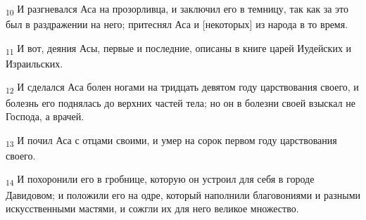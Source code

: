 \begin{tcolorbox}
\textsubscript{10} И разгневался Аса на прозорливца, и заключил его в темницу, так как за это был в раздражении на него; притеснял Аса и [некоторых] из народа в то время.
\end{tcolorbox}
\begin{tcolorbox}
\textsubscript{11} И вот, деяния Асы, первые и последние, описаны в книге царей Иудейских и Израильских.
\end{tcolorbox}
\begin{tcolorbox}
\textsubscript{12} И сделался Аса болен ногами на тридцать девятом году царствования своего, и болезнь его поднялась до верхних частей тела; но он в болезни своей взыскал не Господа, а врачей.
\end{tcolorbox}
\begin{tcolorbox}
\textsubscript{13} И почил Аса с отцами своими, и умер на сорок первом году царствования своего.
\end{tcolorbox}
\begin{tcolorbox}
\textsubscript{14} И похоронили его в гробнице, которую он устроил для себя в городе Давидовом; и положили его на одре, который наполнили благовониями и разными искусственными мастями, и сожгли их для него великое множество.
\end{tcolorbox}
